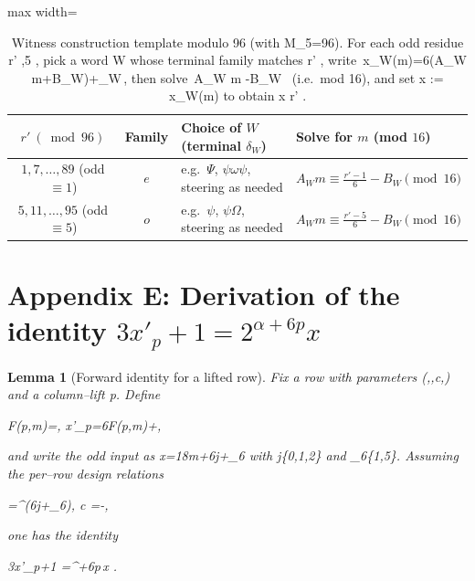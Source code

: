 \documentclass[11pt,letterpaper]{amsart}
\def\mathrm#1{#1}%
\def\({}%
\def\){}%
\def\[{ }%
\def\]{ }%
\theoremstyle{definition}
\theoremstyle{plain}
\newtheorem{lemma}{Lemma}
\theoremstyle{plain}
\theoremstyle{remark}
\newif\ifidentity
\begin{document}
\begin{table}[!htbp]
\centering
\caption{Witness construction template modulo \texorpdfstring{\(96\)}{96} (with \texorpdfstring{\(M_5=96\)}{M5=96}).
For each odd residue \texorpdfstring{\(r' ,5 \)}{r' congruent 1,5 mod 6}, pick a word \(W\) whose terminal family matches \texorpdfstring{\(r' \)}{r' mod 6}, write \(\,x_W(m)=6(A_W m+B_W)+\delta_W\,\), then solve
\(\,A_W m \equiv {}-B_W \,\) (i.e.\ mod \(16\)),
and set \(x := x_W(m)\) to obtain \(x \equiv r' \).}

\label{tab:witnesses-mod-96-template}
\begin{adjustbox}{max width=\textwidth}
\begin{tabular}{@{}c c l l@{}}
\toprule
$r' \ (\bmod 96)$ & Family & Choice of $W$ (terminal $\delta_W$) & Solve for $m$ (mod $16$) \\ \midrule
$1,7,\ldots, 89$ (odd $\equiv 1$)  & $\mathrm e$ & e.g.\ $\Psi$, $\psi\omega\psi$, steering as needed & $A_W m \equiv \tfrac{r'-1}{6}-B_W \pmod{16}$\\
$5,11,\ldots, 95$ (odd $\equiv 5$) & $\mathrm o$ & e.g.\ $\psi$, $\psi\Omega$, steering as needed & $A_W m \equiv \tfrac{r'-5}{6}-B_W \pmod{16}$\\
\bottomrule
\end{tabular}
\end{adjustbox}
\end{table}


\newpage



\ifidentity
\section*{Appendix E: Derivation of the identity
  \texorpdfstring{$3x'_p+1=2^{\alpha+6p}x$}{3 x prime p + 1 = 2 to the power (alpha + 6 p) x}}


\begin{lemma}[Forward identity for a lifted row]
Fix a row with parameters \((\alpha,\beta,c,\delta)\) and a column--lift \(p\). Define
\[
F(p,m)\;=\;,
\qquad
x'_p\;=\;6F(p,m)+\delta,
\]
and write the odd input as \(x=18m+6j+\delta_{6}\) with \(j\in\{0,1,2\}\) and \(\delta_{6}\in\{1,5\}\).
Assuming the per--row design relations
\[
\beta \;=^{}(6j+\delta_{6}),
\qquad
c \;=\;-,
\]
one has the identity
\[
3x'_p+1 \;=^{\alpha+6p}\,x .
\]
\end{lemma}
\end{document}
